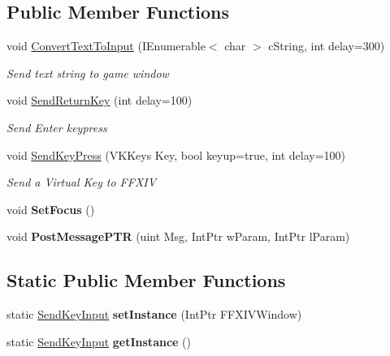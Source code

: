 \subsection*{Public Member Functions}
\begin{DoxyCompactItemize}
\item 
void \hyperlink{classffxivlib_1_1_send_key_input_aa8f7cbdf5bafad8f57313b1bd5731cf4}{Convert\-Text\-To\-Input} (I\-Enumerable$<$ char $>$ c\-String, int delay=300)
\begin{DoxyCompactList}\small\item\em Send text string to game window \end{DoxyCompactList}\item 
void \hyperlink{classffxivlib_1_1_send_key_input_a3302a44e82c7edee92ad9ceacce87fa6}{Send\-Return\-Key} (int delay=100)
\begin{DoxyCompactList}\small\item\em Send Enter keypress \end{DoxyCompactList}\item 
void \hyperlink{classffxivlib_1_1_send_key_input_a66eab8ca2057b2b7b37f1f1f76a43f2a}{Send\-Key\-Press} (V\-K\-Keys Key, bool keyup=true, int delay=100)
\begin{DoxyCompactList}\small\item\em Send a Virtual Key to F\-F\-X\-I\-V \end{DoxyCompactList}\item 
\hypertarget{classffxivlib_1_1_send_key_input_aec916a6b910122da2683c311b2cacb67}{void {\bfseries Set\-Focus} ()}\label{classffxivlib_1_1_send_key_input_aec916a6b910122da2683c311b2cacb67}

\item 
\hypertarget{classffxivlib_1_1_send_key_input_a01a23da6e4e33c5e8d107c6942c491d8}{void {\bfseries Post\-Message\-P\-T\-R} (uint Msg, Int\-Ptr w\-Param, Int\-Ptr l\-Param)}\label{classffxivlib_1_1_send_key_input_a01a23da6e4e33c5e8d107c6942c491d8}

\end{DoxyCompactItemize}
\subsection*{Static Public Member Functions}
\begin{DoxyCompactItemize}
\item 
\hypertarget{classffxivlib_1_1_send_key_input_a61972fc0a62991c8a5d9b0987cd5984f}{static \hyperlink{classffxivlib_1_1_send_key_input}{Send\-Key\-Input} {\bfseries set\-Instance} (Int\-Ptr F\-F\-X\-I\-V\-Window)}\label{classffxivlib_1_1_send_key_input_a61972fc0a62991c8a5d9b0987cd5984f}

\item 
\hypertarget{classffxivlib_1_1_send_key_input_a75e37e328b5fe2d9ad557f9702b17119}{static \hyperlink{classffxivlib_1_1_send_key_input}{Send\-Key\-Input} {\bfseries get\-Instance} ()}\label{classffxivlib_1_1_send_key_input_a75e37e328b5fe2d9ad557f9702b17119}

\end{DoxyCompactItemize}
